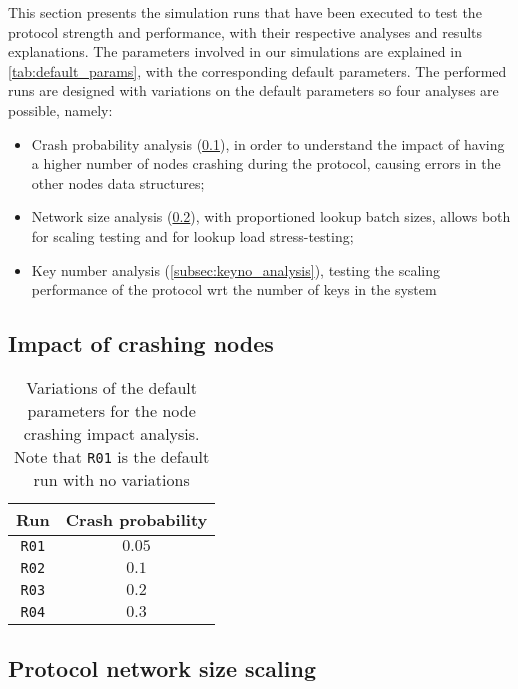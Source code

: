 \documentclass[11pt,twocolumn,letterpaper]{article}
\begin{document}
	This section presents the simulation runs that have been executed to test the protocol strength and performance, with their respective analyses and results explanations. The parameters involved in our simulations are explained in \cref{tab:default_params}, with the corresponding default parameters. The performed runs are designed with variations on the default parameters so four analyses are possible, namely:
	\begin{itemize}
		\item Crash probability analysis (\cref{subsec:crash_analysis}), in order to understand the impact of having a higher number of nodes crashing during the protocol, causing errors in the other nodes data structures;
		\item Network size analysis (\cref{subsec:netsize_analysis}), with proportioned lookup batch sizes, allows both for scaling testing and for lookup load stress-testing;
		\item Key number analysis (\cref{subsec:keyno_analysis}), testing the scaling performance of the protocol wrt the number of keys in the system
	\end{itemize}
	
	\subsection{Impact of crashing nodes}
	\label{subsec:crash_analysis}
	
	\begin{table}[h!]
		\caption{Variations of the default parameters for the node crashing impact analysis. Note that \texttt{R01} is the default run with no variations}
		\label{tab:crash_runs}
		\centering
		\begin{tabular}{cc}
			\hline
			\textbf{Run} & \textbf{Crash probability}\\
			\hline
			\texttt{R01} & $0.05$\\
			\hline
			\texttt{R02} & $0.1$\\
			\hline
			\texttt{R03} & $0.2$\\
			\hline
			\texttt{R04} & $0.3$\\
			\hline
		\end{tabular}
	\end{table}		

	\subsection{Protocol network size scaling}
	\label{subsec:netsize_analysis}
	
\end{document}
